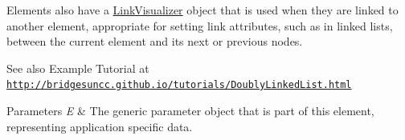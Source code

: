 Elements also have a \hyperlink{classbridges_1_1base_1_1_link_visualizer}{Link\+Visualizer} object that is used when they are linked to another element, appropriate for setting link attributes, such as in linked lists, between the current element and its next or previous nodes.

\begin{DoxySeeAlso}{See also}
Example Tutorial at ~\newline
 \href{http://bridgesuncc.github.io/tutorials/DoublyLinkedList.html}{\tt http\+://bridgesuncc.\+github.\+io/tutorials/\+Doubly\+Linked\+List.\+html}
\end{DoxySeeAlso}

\begin{DoxyParams}{Parameters}
{\em E} & The generic parameter object that is part of this element, representing application specific data. \\
\hline
\end{DoxyParams}
